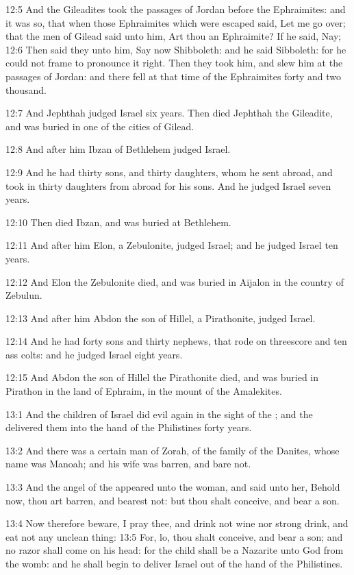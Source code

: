 12:5 And the Gileadites took the passages of Jordan before the Ephraimites: and it was so, that when those Ephraimites which were escaped said, Let me go over; that the men of Gilead said unto him, Art thou an Ephraimite? If he said, Nay; 12:6 Then said they unto him, Say now Shibboleth: and he said Sibboleth: for he could not frame to pronounce it right. Then they took him, and slew him at the passages of Jordan: and there fell at that time of the Ephraimites forty and two thousand.

12:7 And Jephthah judged Israel six years. Then died Jephthah the Gileadite, and was buried in one of the cities of Gilead.

12:8 And after him Ibzan of Bethlehem judged Israel.

12:9 And he had thirty sons, and thirty daughters, whom he sent abroad, and took in thirty daughters from abroad for his sons. And he judged Israel seven years.

12:10 Then died Ibzan, and was buried at Bethlehem.

12:11 And after him Elon, a Zebulonite, judged Israel; and he judged Israel ten years.

12:12 And Elon the Zebulonite died, and was buried in Aijalon in the country of Zebulun.

12:13 And after him Abdon the son of Hillel, a Pirathonite, judged Israel.

12:14 And he had forty sons and thirty nephews, that rode on threescore and ten ass colts: and he judged Israel eight years.

12:15 And Abdon the son of Hillel the Pirathonite died, and was buried in Pirathon in the land of Ephraim, in the mount of the Amalekites.

13:1 And the children of Israel did evil again in the sight of the \LORD; and the \LORD delivered them into the hand of the Philistines forty years.

13:2 And there was a certain man of Zorah, of the family of the Danites, whose name was Manoah; and his wife was barren, and bare not.

13:3 And the angel of the \LORD appeared unto the woman, and said unto her, Behold now, thou art barren, and bearest not: but thou shalt conceive, and bear a son.

13:4 Now therefore beware, I pray thee, and drink not wine nor strong drink, and eat not any unclean thing: 13:5 For, lo, thou shalt conceive, and bear a son; and no razor shall come on his head: for the child shall be a Nazarite unto God from the womb: and he shall begin to deliver Israel out of the hand of the Philistines.

